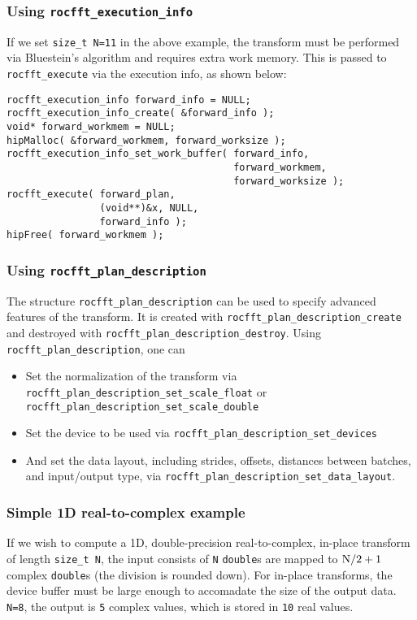\documentclass[10pt]{article}
\renewcommand{\(}{\left(}
\renewcommand{\)}{\right)}
\begin{document}
\subsubsection{Using \lstinline{rocfft_execution_info}}
If we set \lstinline{size_t N=11} in the above example, the transform
must be performed via Bluestein's algorithm and requires extra work
memory.  This is passed to \lstinline{rocfft_execute} via the
execution info, as shown below:
\begin{lstlisting}
rocfft_execution_info forward_info = NULL;
rocfft_execution_info_create( &forward_info );
void* forward_workmem = NULL;
hipMalloc( &forward_workmem, forward_worksize );
rocfft_execution_info_set_work_buffer( forward_info,
                                       forward_workmem,
                                       forward_worksize );
rocfft_execute( forward_plan,
                (void**)&x, NULL,
                forward_info );
hipFree( forward_workmem );
\end{lstlisting}

\subsubsection{Using \lstinline{rocfft_plan_description}}

The structure \lstinline{rocfft_plan_description} can be used to
specify advanced features of the transform.  It is created with
\lstinline{rocfft_plan_description_create} and destroyed with
\lstinline{rocfft_plan_description_destroy}.  Using
\lstinline{rocfft_plan_description}, one can
\begin{itemize}
\item Set the normalization of the transform via
  \lstinline{rocfft_plan_description_set_scale_float} or
  \lstinline{rocfft_plan_description_set_scale_double}
\item Set the device to be used via
  \lstinline{rocfft_plan_description_set_devices}
\item And set the data layout, including strides, offsets, distances
  between batches, and input/output type, via 
  \lstinline{rocfft_plan_description_set_data_layout}.
\end{itemize}

\subsubsection{Simple 1D real-to-complex example}
If we wish to compute a 1D, double-precision real-to-complex, in-place
transform of length \lstinline{size_t N}, the input consists of
\lstinline{N} \lstinline{double}s are mapped to
$\text{\lstinline{N}}/2 + 1$ complex \lstinline{double}s (the division
is rounded down).  For in-place transforms, the device buffer must be
large enough to accomadate the size of the output
data. \lstinline{N=8}, the output is \lstinline{5} complex
values, which is stored in \lstinline{10} real values.
\end{document}
